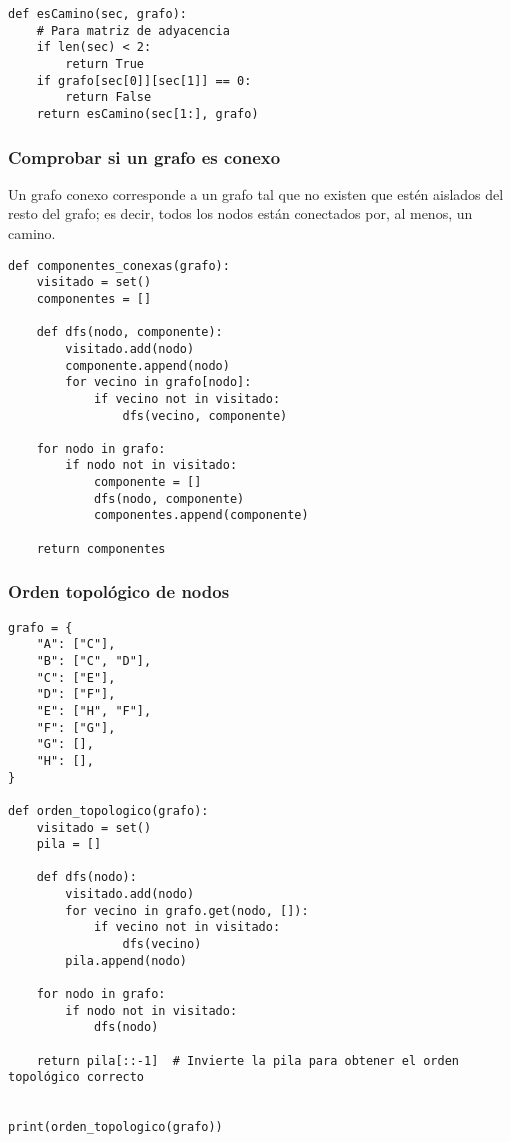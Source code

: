 \documentclass[12pt,letterpaper]{article}
\begin{document}
\begin{verbatim}
def esCamino(sec, grafo):
    # Para matriz de adyacencia
    if len(sec) < 2:
        return True
    if grafo[sec[0]][sec[1]] == 0:
        return False
    return esCamino(sec[1:], grafo)
\end{verbatim}

\subsubsection{Comprobar si un grafo es conexo}

Un grafo conexo corresponde a un grafo tal que no existen que estén aislados del resto del grafo; es decir, todos los nodos están conectados por, al menos, un camino.

\begin{verbatim}
def componentes_conexas(grafo):
    visitado = set()
    componentes = []

    def dfs(nodo, componente):
        visitado.add(nodo)
        componente.append(nodo)
        for vecino in grafo[nodo]:
            if vecino not in visitado:
                dfs(vecino, componente)

    for nodo in grafo:
        if nodo not in visitado:
            componente = []
            dfs(nodo, componente)
            componentes.append(componente)

    return componentes
\end{verbatim}

\subsubsection{Orden topológico de nodos}

\begin{verbatim}
grafo = {
    "A": ["C"],
    "B": ["C", "D"],
    "C": ["E"],
    "D": ["F"],
    "E": ["H", "F"],
    "F": ["G"],
    "G": [],
    "H": [],
}

def orden_topologico(grafo):
    visitado = set()
    pila = []

    def dfs(nodo):
        visitado.add(nodo)
        for vecino in grafo.get(nodo, []):
            if vecino not in visitado:
                dfs(vecino)
        pila.append(nodo)

    for nodo in grafo:
        if nodo not in visitado:
            dfs(nodo)

    return pila[::-1]  # Invierte la pila para obtener el orden topológico correcto


print(orden_topologico(grafo))
\end{verbatim}
\end{document}
